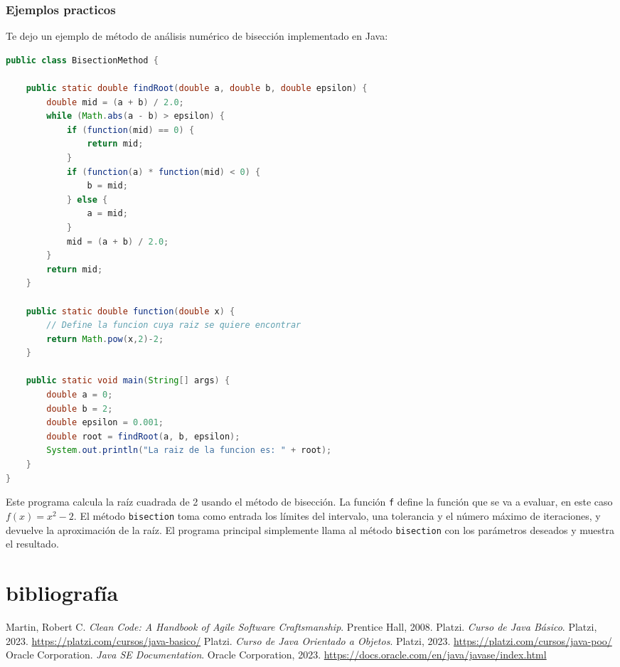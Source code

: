 \documentclass{article}
\begin{document}
\subsubsection{Ejemplos practicos}
Te dejo un ejemplo de método de análisis numérico de bisección implementado en Java:
\begin{lstlisting}[language=Java]
public class BisectionMethod {

    public static double findRoot(double a, double b, double epsilon) {
        double mid = (a + b) / 2.0;
        while (Math.abs(a - b) > epsilon) {
            if (function(mid) == 0) {
                return mid;
            }
            if (function(a) * function(mid) < 0) {
                b = mid;
            } else {
                a = mid;
            }
            mid = (a + b) / 2.0;
        }
        return mid;
    }

    public static double function(double x) {
        // Define la funcion cuya raiz se quiere encontrar
        return Math.pow(x,2)-2;
    }

    public static void main(String[] args) {
        double a = 0;
        double b = 2;
        double epsilon = 0.001;
        double root = findRoot(a, b, epsilon);
        System.out.println("La raiz de la funcion es: " + root);
    }
}
\end{lstlisting}
Este programa calcula la raíz cuadrada de 2 usando el método de bisección. La función \texttt{f} define la función que se va a evaluar, en este caso $f(x) = x^2 - 2$. El método \texttt{bisection} toma como entrada los límites del intervalo, una tolerancia y el número máximo de iteraciones, y devuelve la aproximación de la raíz. El programa principal simplemente llama al método \texttt{bisection} con los parámetros deseados y muestra el resultado.








\newpage
\section{bibliografía}
\begin{thebibliography}{9}
 Martin, Robert C. \textit{Clean Code: A Handbook of Agile Software Craftsmanship}. Prentice Hall, 2008.
 Platzi. \textit{Curso de Java Básico}. Platzi, 2023. \url{https://platzi.com/cursos/java-basico/}
 Platzi. \textit{Curso de Java Orientado a Objetos}. Platzi, 2023. \url{https://platzi.com/cursos/java-poo/}
 Oracle Corporation. \textit{Java SE Documentation}. Oracle Corporation, 2023. \url{https://docs.oracle.com/en/java/javase/index.html}
\end{thebibliography}
\end{document}
